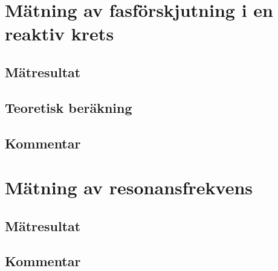 \documentclass[11pt,a4paper]{article}
\begin{document}
\section{Mätning av fasförskjutning i en reaktiv krets}\label{}

\subsection{Mätresultat}\label{}

\subsection{Teoretisk beräkning}\label{}

\subsection{Kommentar}\label{}


\section{Mätning av resonansfrekvens}\label{}

\subsection{Mätresultat}\label{}

\subsection{Kommentar}\label{}
\end{document}
